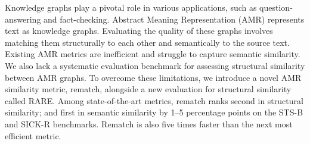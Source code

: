 Knowledge graphs play a pivotal role in various applications, such as question-answering and fact-checking. Abstract Meaning Representation (AMR) represents text as knowledge graphs. Evaluating the quality of these graphs involves matching them structurally to each other and semantically to the source text. Existing AMR metrics are inefficient and struggle to capture semantic similarity. We also lack a systematic evaluation benchmark for assessing structural similarity between AMR graphs. To overcome these limitations, we introduce a novel AMR similarity metric, rematch, alongside a new evaluation for structural similarity called RARE. Among state-of-the-art metrics, rematch ranks second in structural similarity; and first in semantic similarity by 1--5 percentage points on the STS-B and SICK-R benchmarks. Rematch is also five times faster than the next most efficient metric.